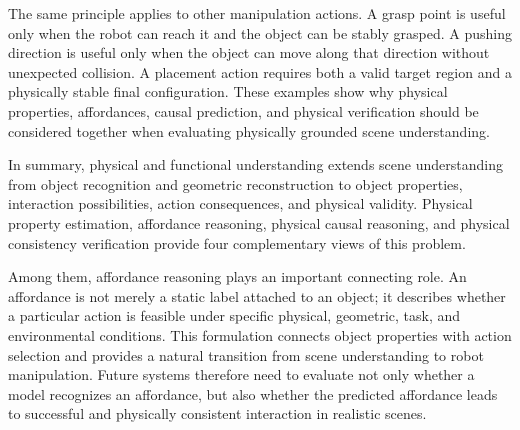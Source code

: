 \documentclass{SCIS2026}
\begin{document}
The same principle applies to other manipulation actions. A grasp point is
useful only when the robot can reach it and the object can be stably grasped.
A pushing direction is useful only when the object can move along that
direction without unexpected collision. A placement action requires both a
valid target region and a physically stable final configuration. These
examples show why physical properties, affordances, causal prediction, and
physical verification should be considered together when evaluating
physically grounded scene understanding.



In summary, physical and functional understanding extends scene
understanding from object recognition and geometric reconstruction to object
properties, interaction possibilities, action consequences, and physical
validity. Physical property estimation, affordance reasoning, physical causal
reasoning, and physical consistency verification provide four complementary
views of this problem.

Among them, affordance reasoning plays an important connecting role. An
affordance is not merely a static label attached to an object; it describes
whether a particular action is feasible under specific physical, geometric,
task, and environmental conditions. This formulation connects object
properties with action selection and provides a natural transition from
scene understanding to robot manipulation. Future systems therefore need to
evaluate not only whether a model recognizes an affordance, but also whether
the predicted affordance leads to successful and physically consistent
interaction in realistic scenes.

\end{document}

